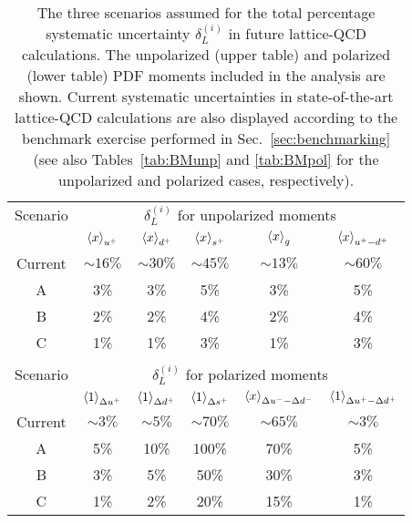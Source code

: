\begin{table}[!t]
\centering
\footnotesize
\renewcommand{\arraystretch}{1.3} 
\begin{tabular}{cccccc}
\toprule
Scenario &  \multicolumn{5}{c}{$\delta_L^{(i)}$ for unpolarized moments} \\
& $\left\langle x\right\rangle_{u^+}$ 
& $\left\langle x\right\rangle_{d^+}$ 
& $\left\langle x\right\rangle_{s^+}$  
& $\left\langle x\right\rangle_{g}$  
&   $\left\langle x\right\rangle_{u^+-d^+}$  \\
\midrule
Current  
& $\sim 16\%$  
& $\sim 30\%$ 
& $\sim 45\%$  
& $\sim 13\%$  
& $\sim 60\%$ \\
A   & 3\%  & 3\% &  5\% &  3\% &  5\% \\
B   & 2\%  & 2\% &  4\% &  2\% &  4\%  \\
C   & 1\%  & 1\% &  3\% &  1\% &  3\%  \\
\bottomrule
\\
\toprule
Scenario & \multicolumn{5}{c}{$\delta_L^{(i)}$ for polarized moments} \\ 
& $\left\langle 1\right\rangle_{\Delta u^+}$  
& $\left\langle 1\right\rangle_{\Delta d^+}$  
& $\left\langle 1\right\rangle_{\Delta s^+}$
& $\left\langle x\right\rangle_{\Delta u^--\Delta d^-}$  
& $\left\langle 1\right\rangle_{\Delta u^+ - \Delta d^+}$\\
\midrule
Current  
& $\sim 3\%$  
& $\sim 5\%$ 
& $\sim 70\%$ 
& $\sim 65\%$ 
& $\sim 3\%$ \\
A   & 5\% & 10\%  & 100\% & 70\%  & 5\% \\
B   & 3\% &  5\%  &  50\% & 30\%  & 3\% \\
C   & 1\% &  2\%  &  20\% & 15\%  & 1\% \\
\bottomrule
\end{tabular}
\caption{\small The three scenarios assumed for the total percentage
systematic uncertainty $\delta_L^{(i)}$ in future lattice-QCD calculations.
%
The unpolarized (upper table) and polarized (lower table) PDF moments
included in the analysis are shown.
%
Current systematic uncertainties in state-of-the-art lattice-QCD calculations
are also displayed according to the benchmark exercise performed in
Sec.~\ref{sec:benchmarking} (see also Tables~\ref{tab:BMunp} 
and \ref{tab:BMpol} for the unpolarized and polarized cases, respectively).
\label{tab:scenarios}
}
\end{table}

